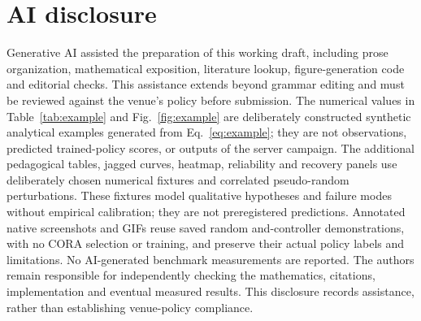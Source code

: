 \documentclass[runningheads]{llncs}
\begin{document}
\section*{AI disclosure}
Generative AI assisted the preparation of this working draft, including prose organization, mathematical exposition, literature lookup, figure-generation code and editorial checks. This assistance extends beyond grammar editing and must be reviewed against the venue's policy before submission. The numerical values in Table~\ref{tab:example} and Fig.~\ref{fig:example} are deliberately constructed synthetic analytical examples generated from Eq.~\eqref{eq:example}; they are not observations, predicted trained-policy scores, or outputs of the server campaign. The additional pedagogical tables, jagged curves, heatmap, reliability and recovery panels use deliberately chosen numerical fixtures and correlated pseudo-random perturbations. These fixtures model qualitative hypotheses and failure modes without empirical calibration; they are not preregistered predictions. Annotated native screenshots and GIFs reuse saved random and-controller demonstrations, with no CORA selection or training, and preserve their actual policy labels and limitations. No AI-generated benchmark measurements are reported. The authors remain responsible for independently checking the mathematics, citations, implementation and eventual measured results. This disclosure records assistance, rather than establishing venue-policy compliance.
\end{document}
